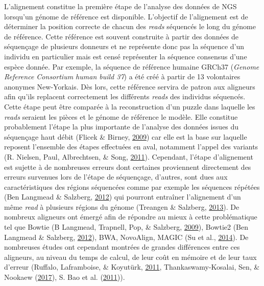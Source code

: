 \documentclass[12pt,twoside]{reedthesis}
\theoremstyle{definition}
\theoremstyle{definition}
\theoremstyle{remark}
\begin{document}
  L'alignement constitue la première étape de l'analyse des données de NGS
  lorsqu'un génome de référence est disponible. L'objectif de l'alignement
  est de déterminer la position correcte de chacun des \emph{reads}
  séquencés le long du génome de référence. Cette référence est souvent
  construite à partir des données de séquençage de plusieurs donneurs et
  ne représente donc pas la séquence d'un individu en particulier mais est
  censé représenter la séquence consensus d'une espèce donnée. Par
  exemple, la séquence de référence humaine GRCh37 (\emph{Genome Reference
  Consortium human build 37}) a été créé à partir de 13 volontaires
  anonymes New-Yorkais. Dès lors, cette référence servira de patron aux
  aligneurs afin qu'ils replacent correctement les différents \emph{reads}
  des individus séquencés. Cette étape peut être comparée à la
  reconstruction d'un puzzle dans laquelle les \emph{reads} seraient les
  pièces et le génome de référence le modèle. Elle constitue probablement
  l'étape la plus importante de l'analyse des données issues du séquençage
  haut débit (Flicek \& Birney, \protect\hyperlink{ref-Flicek2009}{2009})
  car elle est la base sur laquelle reposent l'ensemble des étapes
  effectuées en aval, notamment l'appel des variants (R. Nielsen, Paul,
  Albrechtsen, \& Song, \protect\hyperlink{ref-Nielsen2011}{2011}).
  Cependant, l'étape d'alignement est sujette à de nombreuses erreurs dont
  certaines proviennent directement des erreurs survenues lors de l'étape
  de séquençage, d'autres, sont dues aux caractéristiques des régions
  séquencées comme par exemple les séquences répétées (Ben Langmead \&
  Salzberg, \protect\hyperlink{ref-Langmead2012}{2012}) qui pourront
  entraîner l'alignement d'un même \emph{read} à plusieurs régions du
  génome (Treangen \& Salzberg,
  \protect\hyperlink{ref-Treangen2013}{2013}). De nombreux aligneurs ont
  émergé afin de répondre au mieux à cette problématique tel que Bowtie (B
  Langmead, Trapnell, Pop, \& Salzberg,
  \protect\hyperlink{ref-Langmead2009}{2009}), Bowtie2 (Ben Langmead \&
  Salzberg, \protect\hyperlink{ref-Langmead2012}{2012}), BWA, NovoAlign,
  MAGIC (Su et al., \protect\hyperlink{ref-Su2014}{2014}). De nombreuses
  études ont cependant montrées de grandes différences entre ces
  aligneurs, au niveau du temps de calcul, de leur coût en mémoire et de
  leur taux d'erreur (Ruffalo, Laframboise, \& Koyutürk,
  \protect\hyperlink{ref-Ruffalo2011}{2011}, Thankaswamy-Kosalai, Sen, \&
  Nookaew (\protect\hyperlink{ref-Thankaswamy-Kosalai2017}{2017}), S. Bao
  et al. (\protect\hyperlink{ref-Bao2011}{2011})).
  
\end{document}
